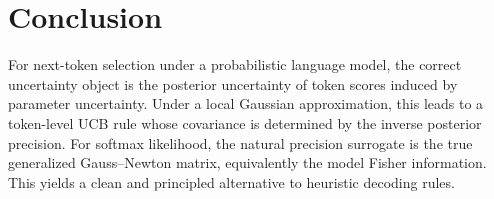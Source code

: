 \documentclass[11pt]{article}
\begin{document}
\section{Conclusion}

For next-token selection under a probabilistic language model, the correct
uncertainty object is the posterior uncertainty of token scores induced by
parameter uncertainty.
Under a local Gaussian approximation, this leads to a token-level UCB rule
whose covariance is determined by the inverse posterior precision.
For softmax likelihood, the natural precision surrogate is the true
generalized Gauss--Newton matrix, equivalently the model Fisher
information.
This yields a clean and principled alternative to heuristic decoding rules.
\end{document}
